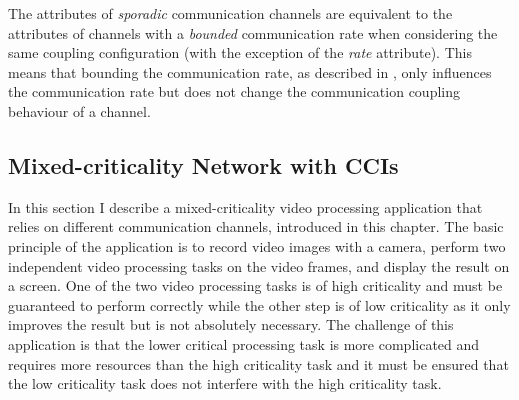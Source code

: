 The attributes of \emph{sporadic} communication channels are equivalent to the attributes of channels with a \emph{bounded} communication rate when considering the same coupling configuration (with the exception of the \emph{rate} attribute).
This means that bounding the communication rate, as described in \Sect{\ref{sect_cci_decoupling_rate}}, only influences the communication rate but does not change the communication coupling behaviour of a channel.

\subsection{Mixed-criticality Network with CCIs}
\label{sect_tcm_cci_example}
In this section I describe a mixed-criticality video processing application that relies on different communication channels, introduced in this chapter.
The basic principle of the application is to record video images with a camera, perform two independent video processing tasks on the video frames, and display the result on a screen.
One of the two video processing tasks is of high criticality and must be guaranteed to perform correctly while the other step is of low criticality as it only improves the result but is not absolutely necessary.
The challenge of this application is that the lower critical processing task is more complicated and requires more resources than the high criticality task and it must be ensured that the low criticality task does not interfere with the high criticality task.

